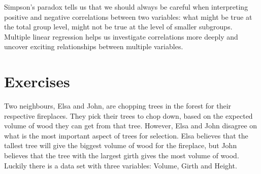 \documentclass[]{report}\usepackage[]{graphicx}\usepackage[]{color}
\begin{document}
Simpson's paradox tells us that we should always be careful when interpreting positive and negative correlations between two variables: what might be true at the total group level, might not be true at the level of smaller subgroups. Multiple linear regression helps us investigate correlations more deeply and uncover exciting relationships between multiple variables.


\section{Exercises}


Two neighbours, Elsa and John, are chopping trees in the forest for their respective fireplaces. They pick their trees to chop down, based on the expected volume of wood they can get from that tree. However, Elsa and John disagree on what is the most important aspect of trees for selection. Elsa believes that the tallest tree will give the biggest volume of wood for the fireplace, but John believes that the tree with the largest girth gives the most volume of wood. Luckily there is a data set with three variables: Volume, Girth and Height.
\end{document}
